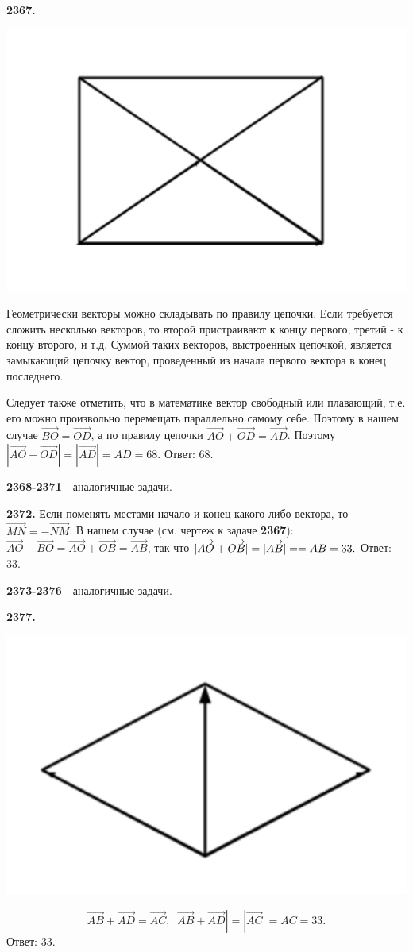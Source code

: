 \textbf{2367.}

{\centering \includegraphics[width=0.5\linewidth]{Geometry/Content/56.png}
	
}

Геометрически векторы можно складывать по правилу цепочки. Если требуется сложить несколько векторов, то второй пристраивают к концу первого, третий - к концу второго, и т.д. Суммой таких векторов, выстроенных цепочкой, является замыкающий цепочку вектор, проведенный из начала первого вектора в конец последнего. 

Следует также отметить, что в математике вектор свободный или плавающий, т.е. его можно произвольно перемещать параллельно самому себе. Поэтому в нашем случае $\overrightarrow{BO}=\overrightarrow{OD}$, а по правилу цепочки $\overrightarrow{AO}+\overrightarrow{OD}=\overrightarrow{AD}$. Поэтому $|\overrightarrow{AO}+\overrightarrow{OD}|=|\overrightarrow{AD}|=AD=68.$ \newline \null \hspace*{\fill} Ответ: 68.

\textbf{2368-2371} - аналогичные задачи. 

\textbf{2372.} Если поменять местами начало и конец какого-либо вектора, то $\overrightarrow{MN}=-\overrightarrow{NM}$. В нашем случае (см. чертеж к задаче \textbf{2367}): $\overrightarrow{AO} - \overrightarrow{BO} = \overrightarrow{AO} + \overrightarrow{OB} = \overrightarrow{AB}$, так что $|\overrightarrow{AO}+\overrightarrow{OB}|=|\overrightarrow{AB}|=\linebreak=AB=33.$ \newline \null \hspace*{\fill} Ответ: 33.

\textbf{2373-2376} - аналогичные задачи.

\textbf{2377.}

{\centering \includegraphics[width=0.5\linewidth]{Geometry/Content/57.png}
	
}
\[
\overrightarrow{AB}+\overrightarrow{AD}=\overrightarrow{AC}, \; |\overrightarrow{AB} + \overrightarrow{AD}| = |\overrightarrow{AC}|=AC=33.
\] \newline \null \hspace*{\fill} Ответ: 33.

